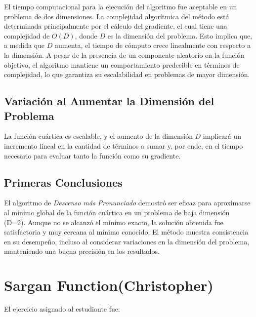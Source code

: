 \documentclass{article}
\begin{document}
	El tiempo computacional para la ejecución del algoritmo fue aceptable en un problema de dos dimensiones. La complejidad algorítmica del método está determinada principalmente por el cálculo del gradiente, el cual tiene una complejidad de \(O(D)\), donde \(D\) es la dimensión del problema. Esto implica que, a medida que \(D\) aumenta, el tiempo de cómputo crece linealmente con respecto a la dimensión. A pesar de la presencia de un componente aleatorio en la función objetivo, el algoritmo mantiene un comportamiento predecible en términos de complejidad, lo que garantiza su escalabilidad en problemas de mayor dimensión.
	
	
	\subsection{Variación al Aumentar la Dimensión del Problema}
	
	La función cuártica es escalable, y el aumento de la dimensión \(D\) implicará un incremento lineal en la cantidad de términos a sumar y, por ende, en el tiempo necesario para evaluar tanto la función como su gradiente.
	
	\subsection{Primeras Conclusiones}
	
	El algoritmo de \textit{Descenso más Pronunciado} demostró ser eficaz para aproximarse al mínimo global de la función cuártica en un problema de baja dimensión (D=2). Aunque no se alcanzó el mínimo exacto, la solución obtenida fue satisfactoria y muy cercana al mínimo conocido. El método muestra consistencia en su desempeño, incluso al considerar variaciones en la dimensión del problema, manteniendo una buena precisión en los resultados.

		
	
	\section{Sargan Function(Christopher)}
	
	El ejercicio asignado al estudiante fue:
	
	\vspace*{1cm}
	
	
\end{document}
